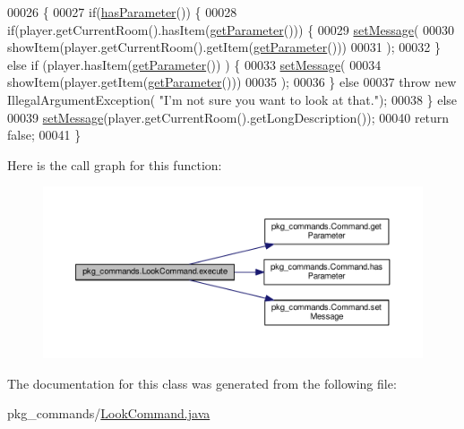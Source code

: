 \begin{DoxyCode}
00026                                                                           \{
00027         \textcolor{keywordflow}{if}(\hyperlink{classpkg__commands_1_1Command_a02af95ab3f1898a66259ab7c177b6998}{hasParameter}()) \{
00028             \textcolor{keywordflow}{if}(player.getCurrentRoom().hasItem(\hyperlink{classpkg__commands_1_1Command_a41c92d445be73ea9d62320c65efb8434}{getParameter}())) \{
00029                 \hyperlink{classpkg__commands_1_1Command_ae210ff216fe908b111ba1c988a963d13}{setMessage}(
00030                         showItem(player.getCurrentRoom().getItem(\hyperlink{classpkg__commands_1_1Command_a41c92d445be73ea9d62320c65efb8434}{getParameter}()))
00031                         );
00032             \} \textcolor{keywordflow}{else} \textcolor{keywordflow}{if} (player.hasItem(\hyperlink{classpkg__commands_1_1Command_a41c92d445be73ea9d62320c65efb8434}{getParameter}()) ) \{
00033                 \hyperlink{classpkg__commands_1_1Command_ae210ff216fe908b111ba1c988a963d13}{setMessage}(
00034                         showItem(player.getItem(\hyperlink{classpkg__commands_1_1Command_a41c92d445be73ea9d62320c65efb8434}{getParameter}()))
00035                         );
00036             \} \textcolor{keywordflow}{else}
00037                 \textcolor{keywordflow}{throw} \textcolor{keyword}{new} IllegalArgumentException( \textcolor{stringliteral}{"I'm not sure you want to look at that."});
00038         \} \textcolor{keywordflow}{else}
00039             \hyperlink{classpkg__commands_1_1Command_ae210ff216fe908b111ba1c988a963d13}{setMessage}(player.getCurrentRoom().getLongDescription());
00040         \textcolor{keywordflow}{return} \textcolor{keyword}{false};
00041     \}
\end{DoxyCode}


Here is the call graph for this function\-:\nopagebreak
\begin{figure}[H]
\begin{center}
\leavevmode
\includegraphics[width=350pt]{classpkg__commands_1_1LookCommand_af336146fae1e14bf434d85a5acbcdcd7_cgraph}
\end{center}
\end{figure}




The documentation for this class was generated from the following file\-:\begin{DoxyCompactItemize}
\item 
pkg\-\_\-commands/\hyperlink{LookCommand_8java}{Look\-Command.\-java}\end{DoxyCompactItemize}
